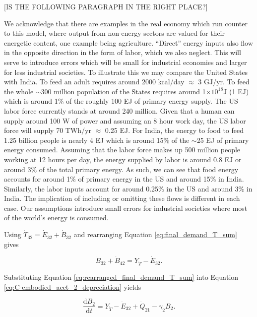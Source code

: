 \documentclass[authoryear,preprint,review,12pt]{elsarticle}
\begin{document}
[IS THE FOLLOWING PARAGRAPH IN THE RIGHT PLACE?]

We acknowledge that there are examples in the real economy which run counter to this model, where output from non-energy sectors are valued for their energetic content, one example being agriculture.  ``Direct'' energy inputs also flow in the opposite direction in the form of labor, which we also neglect. This will serve to introduce errors which will be small for industrial economies and larger for less industrial societies. To illustrate this we may compare the United States with India. To feed an adult requires around 2000 kcal/day $\approx$ 3 GJ/yr. To feed the whole $\sim$300 million population of the States requires around 1$\times 10^{18}$J (1 EJ) which is around 1\% of the roughly 100 EJ of primary energy supply. The US labor force currently stands at around 240 million. Given that a human can supply around 100 W of power and assuming an 8 hour work day, the US labor force will supply 70 TWh/yr $\approx$ 0.25 EJ. For India, the energy to food to feed 1.25 billion people is nearly 4 EJ which is around 15\% of the $\sim$25 EJ of primary energy consumed. Assuming that the labor force makes up 500 million people working at 12 hours per day, the energy supplied by labor is around 0.8 EJ or around 3\% of the total primary energy. As such, we can see that food energy accounts for around 1\% of primary energy in the US and around 15\% in India. Similarly, the labor inputs account for around 0.25\% in the US and around 3\% in India. The implication of including or omitting these flows is different in each case. Our assumptions introduce small errors for industrial societies where most of the world's energy is consumed.

Using $\dot{T}_{32} = \dot{E}_{32} + \dot{B}_{32}$ and rearranging Equation \ref{eq:final_demand_T_sum} gives

\begin{equation} \label{eq:rearranged_final_demand_T_sum}
	\dot{B}_{32} + \dot{B}_{42} = Y_{\dot{T}} - \dot{E}_{32}.
\end{equation}

\noindent Substituting Equation \ref{eq:rearranged_final_demand_T_sum} into Equation \ref{eq:C-embodied_acct_2_depreciation} yields

\begin{equation} \label{eq:intermediate_T_sum_dB2_dt}
	\frac{\mathrm{d}B_2}{\mathrm{d}t} = Y_{\dot{T}} - \dot{E}_{32} + \dot{Q}_{21} - \gamma_2 B_2.
\end{equation}
\end{document}
